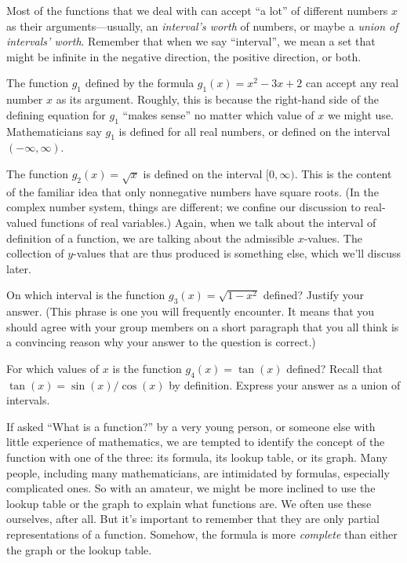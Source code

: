 \documentclass[11pt]{amsart}
\begin{document}
Most of the functions that we deal with can accept ``a lot'' of different numbers $x$ as their arguments---usually, an \emph{interval's worth} of numbers, or maybe a \emph{union of intervals' worth}. Remember that when we say ``interval'', we mean a set that might be infinite in the negative direction, the positive direction, or both.
\begin{example}
	The function $g_1$ defined by the formula $g_1(x) = x^2 - 3x + 2$ can accept any real number $x$ as its argument. Roughly, this is because the right-hand side of the defining equation for $g_1$ ``makes sense'' no matter which value of $x$ we might use. Mathematicians say $g_1$ is defined for all real numbers, or defined on the interval $(-\infty,\infty)$.
\end{example}
\begin{example}
	The function $g_2(x) = \sqrt{x}$ is defined on the interval $[0,\infty)$. This is the content of the familiar idea that only nonnegative numbers have square roots. (In the complex number system, things are different; we confine our discussion to real-valued functions of real variables.) Again, when we talk about the interval of definition of a function, we are talking about the admissible $x$-values. The collection of $y$-values that are thus produced is something else, which we'll discuss later.
\end{example}
\begin{discussionquestion}
	On which interval is the function $g_3(x) = \sqrt{1-x^2}$ defined? Justify your answer. (This phrase is one you will frequently encounter. It means that you should agree with your group members on a short paragraph that you all think is a convincing reason why your answer to the question is correct.)
\end{discussionquestion}
\begin{discussionquestion}
	For which values of $x$ is the function $g_4(x) = \tan(x)$ defined? Recall that $\tan(x) = \sin(x)/\cos(x)$ by definition. Express your answer as a union of intervals.
\end{discussionquestion}

If asked ``What is a function?'' by a very young person, or someone else with little experience of mathematics, we are tempted to identify the concept of the function with one of the three: its formula, its lookup table, or its graph. Many people, including many mathematicians, are intimidated by formulas, especially complicated ones. So with an amateur, we might be more inclined to use the lookup table or the graph to explain what functions are. We often use these ourselves, after all. But it's important to remember that they are only partial representations of a function. Somehow, the formula is more \emph{complete} than either the graph or the lookup table.
\end{document}
